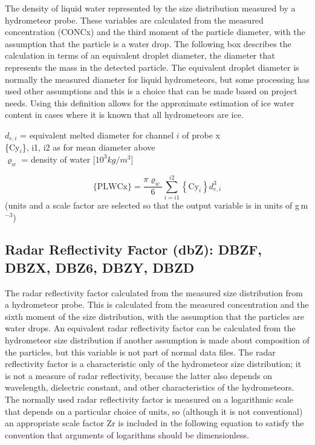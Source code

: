 \documentclass[
  english,
]{book}
\begin{document}
The density of liquid water represented by the size distribution measured by a hydrometeor probe. These variables are calculated from the measured concentration (CONCx) and the third moment of the particle diameter, with the assumption that the particle is a water drop. The following box describes the calculation in terms of an equivalent droplet diameter, the diameter that represents the mass in the detected particle. The equivalent droplet diameter is normally the measured diameter for liquid hydrometeors, but some processing has used other assumptions and this is a choice that can be made based on project needs. Using this definition allows for the approximate estimation of ice water content in cases where it is known that all hydrometeors are ice.

\(d_{e,i}\) = equivalent melted diameter for channel \(i\) of probe x\\
\{Cy\(_{i}\)\}, i1, i2 as for mean diameter above\\
\(\varrho_{w}\)
= density of water {[}\(10^{3}kg/m^{3}\){]}

\begin{equation}
\mathrm{\{PLWCx\}}=\frac{\pi\varrho_{w}}{6}{\textstyle \sum_{i=i1}^{i2}}{\displaystyle {\displaystyle \left\{ \mathrm{Cy}_{i}\right\} d_{e,i}^{3}}}
\label{eq:LWCbox}
\end{equation}
(units and a scale factor are selected so that the output variable
is in units of g\(\,\)m\(^{-3}\))

\hypertarget{DBZ}{%
\subsection*{Radar Reflectivity Factor (dbZ): DBZF, DBZX, DBZ6, DBZY, DBZD}\label{DBZ}}

The radar reflectivity factor calculated from the measured size distribution from a hydrometeor probe. This is calculated from the measured concentration and the sixth moment of the size distribution, with the assumption that the particles are water drops. An equivalent radar reflectivity factor can be calculated from the hydrometeor size distribution if another assumption is made about composition of the particles, but this variable is not part of normal data files. The radar reflectivity factor is a characteristic only of the hydrometeor size distribution; it is not a measure of radar reflectivity, because the latter also depends on wavelength, dielectric constant, and other characteristics of the hydrometeors. The normally used radar reflectivity factor is measured on a logarithmic scale that depends on a particular choice of units, so (although it is not conventional) an appropriate scale factor {Zr} is included in the following equation to satisfy the convention that arguments of logarithms should be dimensionless.
\end{document}
